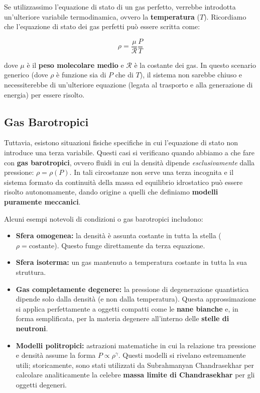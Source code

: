 Se utilizzassimo l'equazione di stato di un gas perfetto, verrebbe introdotta un'ulteriore variabile termodinamica, ovvero la \textbf{temperatura} ($T$). Ricordiamo che l'equazione di stato dei gas perfetti può essere scritta come:

\begin{equation}
\rho = \frac{\mu}{\mathcal{R}} \frac{P}{T}
\end{equation}

dove $\mu$ è il \textbf{peso molecolare medio} e $\mathcal{R}$ è la costante dei gas. In questo scenario generico (dove $\rho$ è funzione sia di $P$ che di $T$), il sistema non sarebbe chiuso e necessiterebbe di un'ulteriore equazione (legata al trasporto e alla generazione di energia) per essere risolto.

\subsection{Gas Barotropici}

Tuttavia, esistono situazioni fisiche specifiche in cui l'equazione di stato non introduce una terza variabile. Questi casi si verificano quando abbiamo a che fare con \textbf{gas barotropici}, ovvero fluidi in cui la densità dipende \textit{esclusivamente} dalla pressione: $\rho = \rho(P)$. In tali circostanze non serve una terza incognita e il sistema formato da continuità della massa ed equilibrio idrostatico può essere risolto autonomamente, dando origine a quelli che definiamo \textbf{modelli puramente meccanici}.

Alcuni esempi notevoli di condizioni o gas barotropici includono:
\begin{itemize}
\item \textbf{Sfera omogenea:} la densità è assunta costante in tutta la stella ($\rho = \text{costante}$). Questo funge direttamente da terza equazione.
\item \textbf{Sfera isoterma:} un gas mantenuto a temperatura costante in tutta la sua struttura.
\item \textbf{Gas completamente degenere:} la pressione di degenerazione quantistica dipende solo dalla densità (e non dalla temperatura). Questa approssimazione si applica perfettamente a oggetti compatti come le \textbf{nane bianche} e, in forma semplificata, per la materia degenere all'interno delle \textbf{stelle di neutroni}.
\item \textbf{Modelli politropici:} astrazioni matematiche in cui la relazione tra pressione e densità assume la forma $P \propto \rho^\gamma$. Questi modelli si rivelano estremamente utili; storicamente, sono stati utilizzati da Subrahmanyan Chandrasekhar per calcolare analiticamente la celebre \textbf{massa limite di Chandrasekhar} per gli oggetti degeneri.
\end{itemize}

